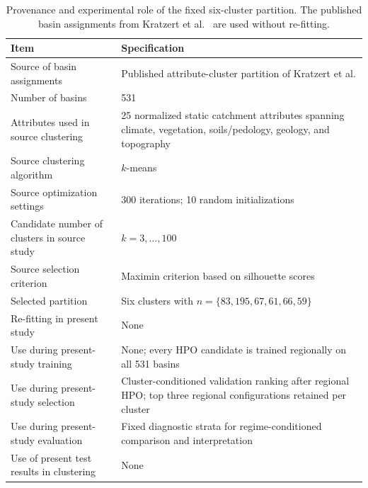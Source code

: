 \begin{table}[htbp]
\centering
\caption{Provenance and experimental role of the fixed six-cluster partition. The published basin assignments from Kratzert et al.~\citeyearpar{Kratzert_2024} are used without re-fitting.}
\label{tab:supp_cluster_provenance}
\small
\renewcommand{\arraystretch}{1.15}
\begin{tabularx}{\textwidth}{>{\raggedright\arraybackslash}p{4.2cm} X}
\toprule
Item & Specification \\
\midrule
Source of basin assignments & Published attribute-cluster partition of Kratzert et al. \citeyearpar{Kratzert_2024} \\
Number of basins & 531 \\
Attributes used in source clustering & 25 normalized static catchment attributes spanning climate, vegetation, soils/pedology, geology, and topography \\
Source clustering algorithm & $k$-means \\
Source optimization settings & 300 iterations; 10 random initializations \\
Candidate number of clusters in source study & $k=3,\ldots,100$ \\
Source selection criterion & Maximin criterion based on silhouette scores \\
Selected partition & Six clusters with $n=\{83,195,67,61,66,59\}$ \\
Re-fitting in present study & None \\
Use during present-study training & None; every HPO candidate is trained regionally on all 531 basins \\
Use during present-study selection & Cluster-conditioned validation ranking after regional HPO; top three regional configurations retained per cluster \\
Use during present-study evaluation & Fixed diagnostic strata for regime-conditioned comparison and interpretation \\
Use of present test results in clustering & None \\
\bottomrule
\end{tabularx}
\end{table}

